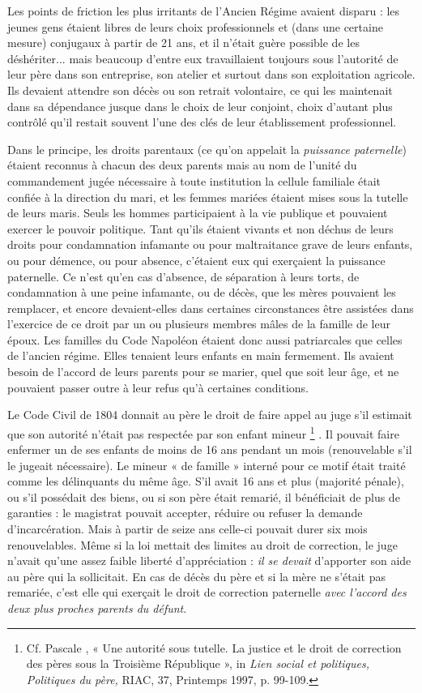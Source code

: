  Les points de friction les plus irritants de l'Ancien Régime avaient disparu : les jeunes gens étaient libres de leurs choix professionnels et (dans une certaine mesure) conjugaux à partir de 21 ans, et il n'était guère possible de les déshériter... mais beaucoup d'entre eux travaillaient toujours sous l'autorité de leur père dans son entreprise, son atelier et surtout dans son exploitation agricole. Ils devaient attendre son décès ou son retrait volontaire, ce qui les maintenait dans sa dépendance jusque dans le choix de leur conjoint, choix d'autant plus contrôlé qu'il restait souvent l'une des clés de leur établissement professionnel. 

 Dans le principe, les droits parentaux (ce qu'on appelait la \emph{puissance paternelle}) étaient reconnus à chacun des deux parents mais au nom de l'unité du commandement jugée nécessaire à toute institution la cellule familiale était confiée à la direction du mari, et les femmes mariées étaient mises sous la tutelle de leurs maris. Seuls les hommes participaient à la vie publique et pouvaient exercer le pouvoir politique. Tant qu'ils étaient vivants et non déchus de leurs droits pour condamnation infamante ou pour maltraitance grave de leurs enfants, ou pour démence, ou pour absence, c'étaient eux qui exerçaient la puissance paternelle. Ce n'est qu'en cas d'absence, de séparation à leurs torts, de condamnation à une peine infamante, ou de décès, que les mères pouvaient les remplacer, et encore devaient-elles dans certaines circonstances être assistées dans l'exercice de ce droit par un ou plusieurs membres mâles de la famille de leur époux. Les familles du Code Napoléon étaient donc aussi patriarcales que celles de l'ancien régime. Elles tenaient leurs enfants en main fermement. Ils avaient besoin de l'accord de leurs parents pour se marier, quel que soit leur âge, et ne pouvaient passer outre à leur refus qu'à certaines conditions. 

 Le Code Civil de 1804 donnait au père le droit de faire appel au juge s'il estimait que son autorité n'était pas respectée par son enfant mineur%
\footnote{Cf. Pascale , « Une autorité sous tutelle. La justice et le droit de correction des pères sous la Troisième République », in \emph{Lien social et politiques, Politiques du père,} RIAC, 37, Printemps 1997, p. 99-109.}%
. Il pouvait faire enfermer un de ses enfants de moins de 16 ans pendant un mois (renouvelable s'il le jugeait nécessaire). Le mineur « de famille » interné pour ce motif était traité comme les délinquants du même âge. S'il avait 16 ans et plus (majorité pénale), ou s'il possédait des biens, ou si son père était remarié, il bénéficiait de plus de garanties : le magistrat pouvait accepter, réduire ou refuser la demande d'incarcération. Mais à partir de seize ans celle-ci pouvait durer six mois renouvelables. Même si la loi mettait des limites au droit de correction, le juge n'avait qu'une assez faible liberté d'appréciation : \emph{il se devait} d'apporter son aide au père qui la sollicitait. En cas de décès du père et si la mère ne s'était pas remariée, c'est elle qui exerçait le droit de correction paternelle \emph{avec l'accord des deux plus proches parents du défunt}. 

